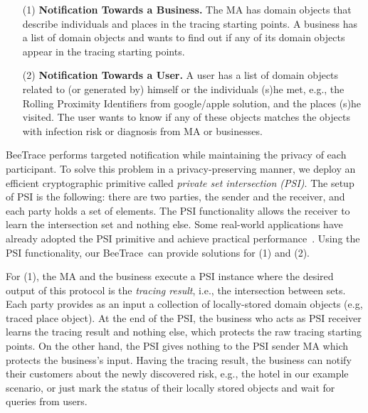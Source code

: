 \documentclass[11pt]{article}  %
\newcommand{\sysname}{\textsf{BeeTrace}\xspace}
\begin{document}
\begin{itemize}
    \item[(1)] \textbf{Notification Towards a Business.} The MA has domain objects that describe individuals and places in the tracing starting points.  A business has a list of domain objects and wants to find out if any of its domain objects appear in the tracing starting points. 
    
    \item[(2)] \textbf{Notification Towards a User.} A user has a list of domain objects related to (or generated  by) himself or the individuals (s)he met, e.g., the Rolling Proximity Identifiers from google/apple solution, and the places (s)he visited. The user wants to know if any of these objects matches the objects with infection risk or diagnosis from MA or businesses. 
\end{itemize}

\sysname performs targeted notification while maintaining the privacy of each participant. 
To solve this problem in a privacy-preserving manner, we deploy an efficient cryptographic primitive called \emph{ private set intersection (PSI)}. 
The setup of PSI is the following: there are two parties, the sender and the receiver, and each party holds a set of elements. 
The PSI functionality allows the receiver to learn the intersection set and nothing else. 
Some real-world applications have already adopted the PSI primitive and achieve practical performance~\cite{Kales2019}. 
Using the PSI functionality, our \sysname\ can provide solutions for (1) and (2). 

For (1), the MA and the business execute a PSI instance where the desired output of this protocol is the \emph{tracing result}, i.e., the intersection between sets.
Each party provides as an input a collection of locally-stored domain objects (e.g, traced place object). At the end of the PSI, the business who acts as PSI receiver learns the tracing result and nothing else, which protects the raw tracing starting points. On the other hand, the PSI gives nothing to the PSI sender MA which protects the business's input. Having the tracing result, 
the business can notify their customers about the newly discovered risk, e.g., the hotel in our example scenario, or just mark the status of their locally stored objects and wait for queries from users. 
\end{document}
